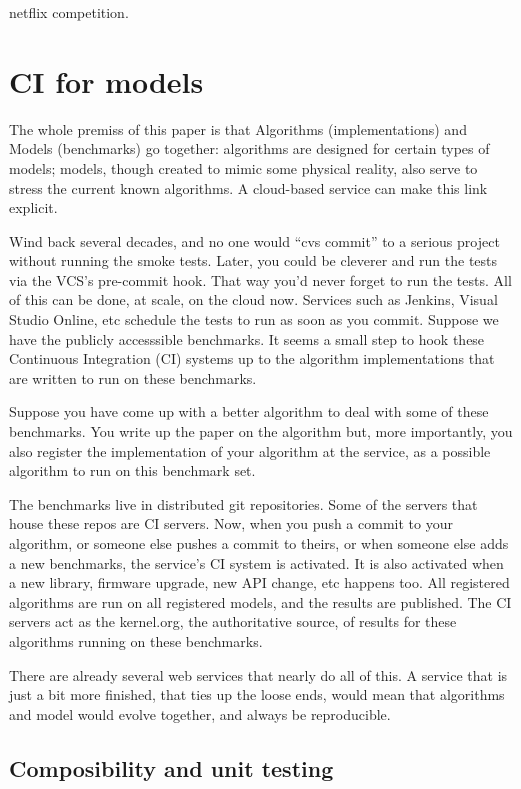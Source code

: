 \documentclass[conference]{IEEEtran}
\begin{document}
netflix competition. 

\section{CI for models}


The whole premiss of this paper is that Algorithms (implementations)
and Models (benchmarks) go together: algorithms are designed for
certain types of models; models, though created to mimic some physical
reality, also serve to stress the current known algorithms. A
cloud-based service can make this link explicit.

Wind back several decades, and no one would ``cvs commit'' to a
serious project without running the smoke tests. Later, you could be
cleverer and run the tests via the VCS's pre-commit hook. That way
you'd never forget to run the tests. All of this can be done, at
scale, on the cloud now. Services such as Jenkins, Visual Studio
Online, etc schedule the tests to run as soon as you commit. Suppose
we have the publicly accesssible benchmarks. It seems a small step to
hook these Continuous Integration (CI) systems up to the algorithm
implementations that are written to run on these benchmarks.

Suppose you have come up with a better algorithm to deal with some of
these benchmarks. You write up the paper on the algorithm but, more
importantly, you also register the implementation of your algorithm at
the service, as a possible algorithm to run on this benchmark set.

The benchmarks live in distributed git repositories. Some of the
servers that house these repos are CI servers. Now, when you push a
commit to your algorithm, or someone else pushes a commit to theirs,
or when someone else adds a new benchmarks, the service's CI system is
activated. It is also activated when a new library, firmware upgrade,
new API change, etc happens too. All registered algorithms are run on
all registered models, and the results are published. The CI servers
act as the kernel.org, the authoritative source, of results for these
algorithms running on these benchmarks.

There are already several web services that nearly do all of this. A
service that is just a bit more finished, that ties up the loose ends,
would mean that algorithms and model would evolve together, and always
be reproducible.

\subsection{Composibility and unit testing}
\end{document}
